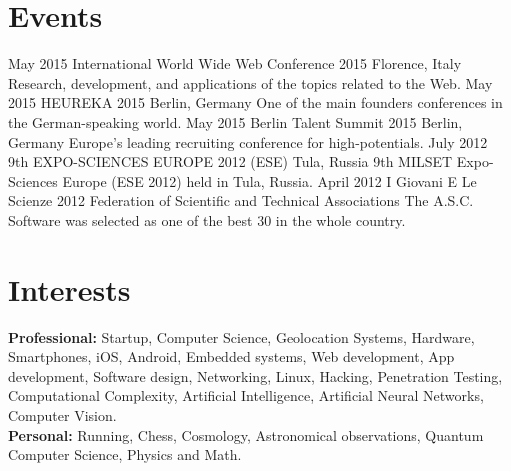 \documentclass[]{friggeri-cv} %
\begin{document}

\section{Events}
\vspace{-3mm}
\begin{entrylist}
\entry
{May 2015}
{International World Wide Web Conference 2015}
{Florence, Italy}
{Research, development, and applications of the topics related to the Web.}
\entry
{May 2015}
{HEUREKA 2015}
{Berlin, Germany}
{One of the main founders conferences in the German­-speaking world.}
\entry
{May 2015}
{Berlin Talent Summit 2015}
{Berlin, Germany}
{Europe's leading recruiting conference for high-potentials.}
\entry
{July 2012}
{9th EXPO-SCIENCES EUROPE 2012 (ESE)}
{Tula, Russia}
{9th MILSET Expo-Sciences Europe (ESE 2012) held in Tula, Russia.}
\entry
{April 2012}
{I Giovani E Le Scienze 2012}
{Federation of Scientific and Technical Associations}
{The A.S.C. Software was selected as one of the best 30 in the whole country.}
\end{entrylist}


\section{Interests}
\vspace{-3mm}
\textbf{Professional:} Startup, Computer Science, Geolocation Systems, Hardware, Smartphones, iOS, Android, Embedded systems, Web development, App development, Software design, Networking, Linux, Hacking, Penetration Testing, Computational Complexity, Artificial Intelligence, Artificial Neural Networks, Computer Vision.\\
\textbf{Personal:} Running, Chess, Cosmology, Astronomical observations, Quantum Computer Science, Physics and Math.

\clearpage
\end{document}
